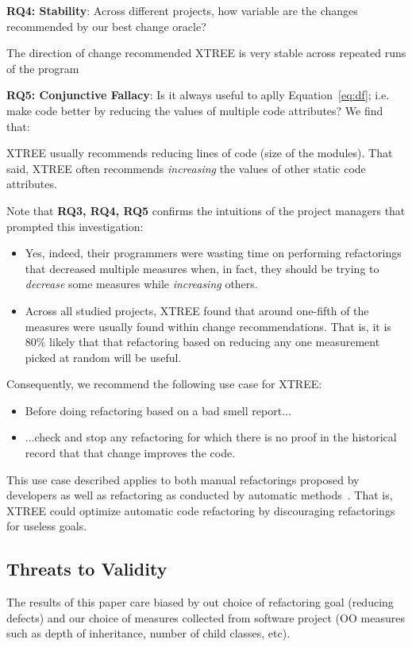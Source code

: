 \documentclass[twocolumn,5p]{elsarticle}
\newcommand{\bi}{\begin{itemize}[leftmargin=0.4cm]}
\newcommand{\ei}{\end{itemize}}
\newcommand{\eq}[1]{Equation~\ref{eq:#1}}
\theoremstyle{break}
\begin{document}
 {\bf RQ4: Stability}: Across different projects, how variable are the changes recommended by our best change oracle?
\begin{lesson}
The direction of change recommended  XTREE is  very stable across repeated runs of the program 
\end{lesson} 

{\bf RQ5: Conjunctive Fallacy}:  
Is it always  useful  to aplly \eq{df}; i.e. make code better by   reducing the values of  multiple code attributes? We find that:
\begin{lesson}
XTREE usually recommends reducing lines of code (size of the modules).
That said,  XTREE often recommends {\em increasing} the values of other static code attributes.
\end{lesson} 
Note that {\bf RQ3, RQ4, RQ5} 
confirms the intuitions
of the project managers that prompted this investigation:
\bi
\item
Yes,  indeed, their programmers
were wasting time on   performing refactorings  that  decreased multiple measures when, in fact,
they should be trying to {\em decrease} some measures while {\em increasing} others.
\item
Across all studied projects, XTREE found that  around one-fifth  
  of the measures were usually found within  change recommendations. That is, it is 80\% likely that
  that refactoring based on reducing any one measurement picked at random will be useful.
\ei
Consequently, we  recommend the following use case for  XTREE:
\bi
\item Before doing  refactoring based on a bad smell report...
\item ...check and stop any refactoring   for which there is no proof
  in the historical record that that change improves the code.
\ei
This use case described  applies to both manual refactorings proposed by developers
as well as refactoring as conducted by automatic methods~\cite{mkaouer2015many}. That is, XTREE could optimize automatic
code refactoring by discouraging refactorings for useless goals.
 


\subsection{ Threats to Validity}
 
The results of this paper care biased by out choice of refactoring goal (reducing defects) and our choice
of measures collected from software project (OO measures such as
  depth of inheritance, number of child classes, etc).
  
\end{document}
